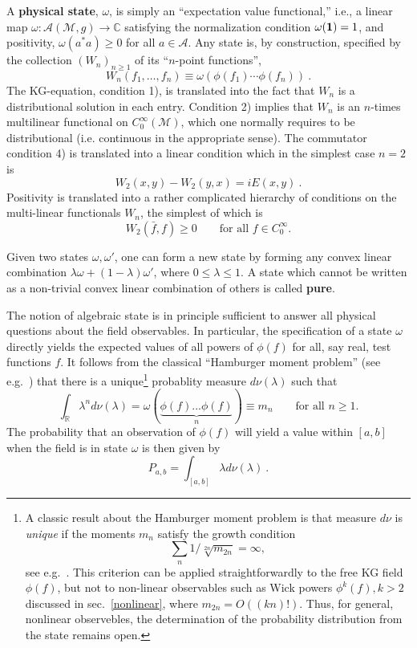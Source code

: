 \documentclass[12pt]{article}
\newcommand{\RR}{\mathbb{R}}
\newcommand{\eA}{\mathscr{A}}
\newcommand{\M}{\mathscr{M}}
\newcommand{\myid}{{\bf 1}}
\newcommand{\mc}{\mathbb{C}}
\theoremstyle{plain}
\theoremstyle{definition}
\def\ben{\begin{equation}}
\def\een{\end{equation}}
\begin{document}
A {\bf physical state}, $\omega$, is simply an ``expectation
value functional,'' i.e., a linear map $\omega: \eA(\M,g) \to \mc$ satisfying the
normalization condition $\omega(\myid) = 1$, and positivity,
$\omega(a^* a) \ge 0$ for all $a \in \eA$. Any state is, by construction,
specified by the collection $(W_n)_{n \ge 1}$ of its ``$n$-point functions'',
\ben
W_n(f_1, \dots, f_n) \equiv \omega(\phi(f_1) \cdots \phi(f_n)) \ .
\een
The KG-equation, condition 1), is translated into the fact that
$W_n$ is a distributional solution in each entry. Condition 2)
implies that $W_n$ is an $n$-times multilinear functional on
$C^\infty_0(\M)$, which one normally requires to be distributional
(i.e. continuous in the appropriate sense). The commutator
condition 4) is translated into a linear condition which in the
simplest case $n=2$ is
\ben
W_2(x,y) - W_2(y,x) = i E(x,y) \ .
\label{commu}
\een
Positivity is translated into a rather complicated hierarchy of
conditions on the multi-linear functionals $W_n$, the simplest of which is
\ben
W_2(\bar f, f) \ge 0 \qquad \text{for all $f \in C_0^\infty$.}
\label{w2pos}
\een

Given two states $\omega, \omega'$,
one can form a new state by forming any convex linear combination
$\lambda \omega + (1-\lambda) \omega'$, where $0 \le \lambda \le 1$.
A state which cannot be written as a non-trivial convex linear combination
of others is called {\bf pure}.

The notion of algebraic state is in principle sufficient to answer all
physical questions about the field observables. In particular, the specification of a state
$\omega$ directly yields the expected values of all powers of $\phi(f)$ for all, say real, test functions $f$.
It follows from the classical ``Hamburger moment problem'' (see e.g.~\cite{simon}) that
there is a unique\footnote{A classic result about the Hamburger moment problem is that 
measure $d\nu$ is {\em unique} if the moments $m_n$ satisfy the growth condition $$\sum_n 1/\sqrt[2n]{m_{2n}}  = \infty,$$
see e.g.~\cite{akhizer}. This criterion can be applied straightforwardly to the free KG field $\phi(f)$, but not to non-linear observables such as Wick powers $\phi^k(f), k>2$ discussed in sec.~\ref{nonlinear}, where $m_{2n} = O((kn)!)$. Thus, for general, nonlinear observebles, the determination of the probability distribution from the state remains open.}  probablity measure $d\nu(\lambda)$ such that
\ben
\int_\RR \lambda^n d\nu(\lambda) = \omega(\underbrace{\phi(f) ... \phi(f)}_{n}) \equiv m_n \qquad
\text{for all $n\ge 1$.}
\een
The probability that
an observation of $\phi(f)$ will yield a value within $[a,b]$ when the field is in state $\omega$
is then given by
\ben
P_{a,b} = \int_{[a,b]} \lambda d\nu(\lambda) \ .
\een
\end{document}
